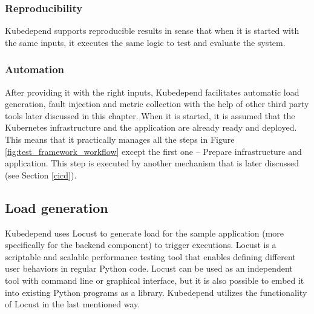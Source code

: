 \subsubsection{Reproducibility}

Kubedepend supports reproducible results in sense that when it is started with the same inputs, it executes the same logic to test and evaluate the system. 

\subsubsection{Automation}

After providing it with the right inputs, Kubedepend facilitates automatic load generation, fault injection and metric collection with the help of other third party tools later discussed in this chapter. When it is started, it is assumed that the Kubernetes infrastructure and the application are already ready and deployed. This means that it practically manages all the steps in Figure \ref{fig:test_framework_workflow} except the first one -- Prepare infrastructure and application. This step is executed by another mechanism that is later discussed (see Section \ref{cicd}).

\subsection{Load generation}


Kubedepend uses Locust \cite{Locust} to generate load for the sample application (more specifically for the backend component) to trigger executions. Locust is a scriptable and scalable performance testing tool that enables defining different user behaviors in regular Python code. Locust can be used as an independent tool with command line or graphical interface, but it is also possible to embed it into existing Python programs as a library. Kubedepend utilizes the functionality of Locust in the last mentioned way.

